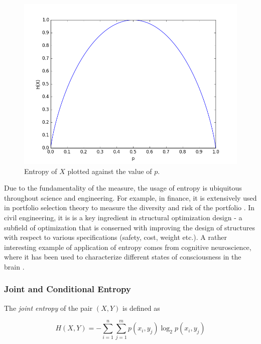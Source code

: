 \documentclass[12pt]{article}
\begin{document}
\begin{figure} [h]
\begin{center}
\includegraphics[width=\textwidth]{entropy}
\caption{Entropy of $X$ plotted against the value of $p$.}
\label{fig:entropy}
\end{center}
\end{figure}

Due to the fundamentality of the measure, the usage of entropy is ubiquitous throughout science and engineering. For example, in finance, it is extensively used in portfolio selection theory to measure the diversity and risk of the portfolio \cite{entropy-finance}. In civil engineering, it is is a key ingredient in structural optimization design \cite{entropy-civil-eng} - a subfield of optimization that is conserned with improving the design of structures with respect to various specifications (safety, cost, weight etc.). A rather interesting example of application of entropy comes from cognitive neuroscience, where it has been used to characterize different states of consciousness in the brain \cite{entropy-consciousness}.

\subsubsection{Joint and Conditional Entropy}

The \textit{joint entropy} \cite{cover-thomas} of the pair $(X,Y)$ is defined as 

\begin{equation}
H(X,Y) = -\sum_{i=1}^n \sum_{j=1}^m p(x_i,y_j) \log_2 p(x_i,y_j)
\label{eq:cond-etropy}
\end{equation}
\end{document}
